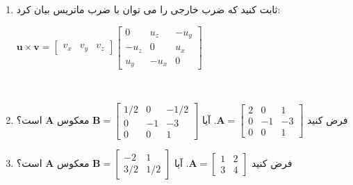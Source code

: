 {\begin{spacing}{1.5}
\begin{enumerate}[label=\textbf{\arabic*}.]
            \item {ثابت کنید که ضرب خارجی را می توان با ضرب ماتریس بیان کرد:
                \begin{center}
                    $\textbf{u}\times\textbf{v}=\begin{bmatrix}
                                                    v_{x} & v_{y} & v_{z}
                    \end{bmatrix}\begin{bmatrix}
                                     0      & u_{z}  & -u_{y} \\
                                     -u_{z} & 0      & u_{x}  \\
                                     u_{y}  & -u_{x} & 0
                    \end{bmatrix}$
                \end{center}
            } \\\textbf{\vspace{6pt}}

            \item {فرض کنید $\textbf{A}=\begin{bmatrix}
                                            2 & 0  & 1  \\
                                            0 & -1 & -3 \\
                                            0 & 0  & 1
            \end{bmatrix}$. آیا $\textbf{B}=\begin{bmatrix}
                                                1/2 & 0  & -1/2 \\
                                                0   & -1 & -3   \\
                                                0   & 0  & 1
            \end{bmatrix}$ معکوس $\textbf{A}$ است؟
            } \\\textbf{\vspace{6pt}}

            \item {فرض کنید $\textbf{A}=\begin{bmatrix}
                                            1 & 2 \\
                                            3 & 4
            \end{bmatrix}$. آیا $\textbf{B}=\begin{bmatrix}
                                                -2  & 1   \\
                                                3/2 & 1/2
            \end{bmatrix}$ معکوس $\textbf{A}$ است؟
            }


\end{enumerate}
\end{spacing}}
